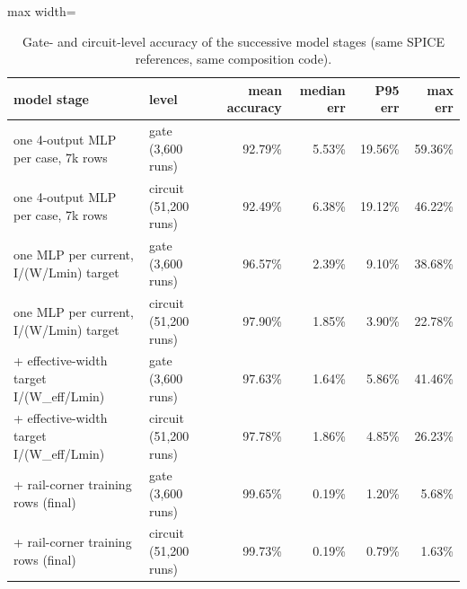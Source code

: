 \begin{table}[H]
\centering
{\small
\begin{adjustbox}{max width=\linewidth}
\begin{tabular}{llrrrr}
\toprule
model stage & level & mean accuracy & median err & P95 err & max err \\
\midrule
one 4-output MLP per case, 7k rows & gate (3,600 runs) & 92.79\% & 5.53\% & 19.56\% & 59.36\% \\
one 4-output MLP per case, 7k rows & circuit (51,200 runs) & 92.49\% & 6.38\% & 19.12\% & 46.22\% \\
one MLP per current, I/(W/Lmin) target & gate (3,600 runs) & 96.57\% & 2.39\% & 9.10\% & 38.68\% \\
one MLP per current, I/(W/Lmin) target & circuit (51,200 runs) & 97.90\% & 1.85\% & 3.90\% & 22.78\% \\
+ effective-width target I/(W\_eff/Lmin) & gate (3,600 runs) & 97.63\% & 1.64\% & 5.86\% & 41.46\% \\
+ effective-width target I/(W\_eff/Lmin) & circuit (51,200 runs) & 97.78\% & 1.86\% & 4.85\% & 26.23\% \\
+ rail-corner training rows (final) & gate (3,600 runs) & 99.65\% & 0.19\% & 1.20\% & 5.68\% \\
+ rail-corner training rows (final) & circuit (51,200 runs) & 99.73\% & 0.19\% & 0.79\% & 1.63\% \\
\bottomrule
\end{tabular}
\end{adjustbox}
}
\caption{Gate- and circuit-level accuracy of the successive model stages (same SPICE references, same composition code).}
\label{tab:stages}
\end{table}

